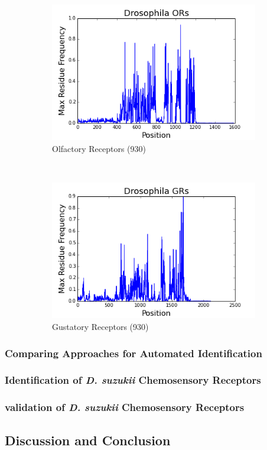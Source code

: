 \begin{figure}[H]
  \centering
  \begin{subfigure}[b]{0.45\textwidth}
    \includegraphics[width=\textwidth]{figures/chemosensory/drosophila_or_max_freq.png}
    \caption{Olfactory Receptors (930)}
    \label{fig:chemosensory:or-max-freq}
  \end{subfigure}
  ~
  \begin{subfigure}[b]{0.45\textwidth}
    \includegraphics[width=\textwidth]{figures/chemosensory/drosophila_gr_max_freq.png}
    \caption{Gustatory Receptors (930)}
    \label{fig:chemosensory:gr-max-freq}
  \end{subfigure}
\label{fig:chemosensory:max-freq}
\caption{}
\end{figure}

\subsubsection{Comparing Approaches for Automated Identification}

\subsubsection{Identification of \emph{D. suzukii} Chemosensory Receptors}

\subsubsection{validation of \emph{D. suzukii} Chemosensory Receptors}

\subsection{Discussion and Conclusion}